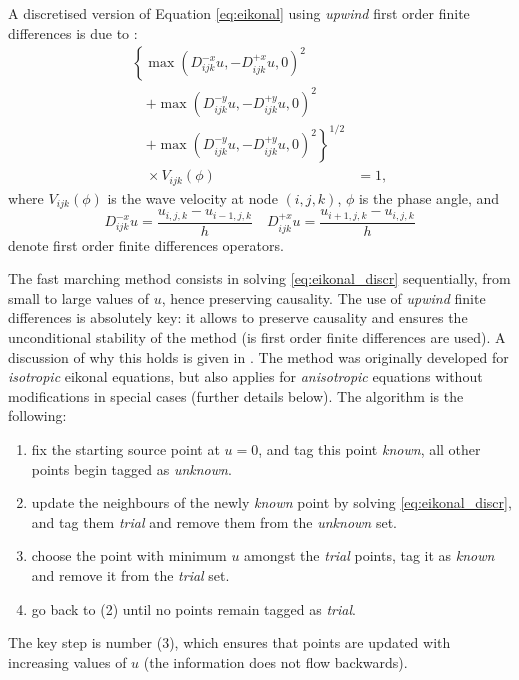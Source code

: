 \documentclass{article}
\begin{document}
A discretised version of Equation \eqref{eq:eikonal} using \emph{upwind} first order finite differences is due to \citet{rouy92}:
\begin{align} 
  \left\{  \max(D^{-x}_{ijk}u, -D^{+x}_{ijk}u, 0)^2 \right. &\nonumber \\
  \quad \left. +  \max(D^{-y}_{ijk}u, -D^{+y}_{ijk}u, 0)^2 \right. &\nonumber \\
  \quad \left. +  \max(D^{-y}_{ijk}u, -D^{+y}_{ijk}u, 0)^2 \right\}^{1/2}& \nonumber \\
\quad  \times V_{ijk}(\phi) & = 1 \label{eq:eikonal_discr},
\end{align}
where $V_{ijk}(\phi)$ is the wave velocity at node $(i,j,k)$, $\phi$ is the phase angle, and 
\begin{equation}
  D^{-x}_{ijk}u = \frac{u_{i,j,k} - u_{i-1,j,k}}{h} \quad D^{+x}_{ijk}u = \frac{u_{i+1,j,k} - u_{i,j,k}}{h}
\end{equation}
denote first order finite differences operators.

The fast marching method consists in solving \eqref{eq:eikonal_discr} sequentially, from small to large values of $u$, hence preserving causality. The use of \emph{upwind} finite differences is absolutely key: it allows to preserve causality and ensures the unconditional stability of the method (is first order finite differences are used). A discussion of why this holds is given in \citet{sethian99}. The method was originally developed for \emph{isotropic} eikonal equations, but also applies for \emph{anisotropic} equations without modifications in special cases (further details below). The algorithm is the following:
\begin{enumerate}
\item fix the starting source point at $u=0$, and tag this point \emph{known}, all other points begin tagged as \emph{unknown}.
\item update the neighbours of the newly \emph{known} point by solving \eqref{eq:eikonal_discr}, and tag them \emph{trial} and remove them from the \emph{unknown} set.
\item choose the point with minimum $u$ amongst the \emph{trial} points, tag it as \emph{known} and remove it from the \emph{trial} set.
\item go back to (2) until no points remain tagged as \emph{trial}.
\end{enumerate}
The key step is number (3), which ensures that points are updated with increasing values of $u$ (the information does not flow backwards).
\end{document}
